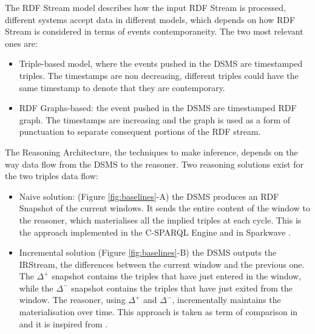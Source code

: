The RDF Stream model describes how the input RDF Stream is processed, different systems accept data in different models, which depends on how RDF Stream is considered in terms of events contemporaneity. The two most relevant ones are:

\begin{itemize}	
\item Triple-based model, where the events pushed in the DSMS are timestamped triples. The timestamps are non decreasing, different triples could have the same timestamp to denote that they are contemporary.
\item RDF Graphs-based: the event pushed in the DSMS are timestamped RDF graph. The timestamps are increasing and the graph is used as a form of punctuation \cite{Tatbul2003b} to separate consequent portions of the RDF stream.
\end{itemize}

The Reasoning Architecture, the techniques to make inference, depends on the way data flow from the DSMS to the reasoner. Two reasoning solutions exist for the two triples data flow:

\begin{itemize}
\item Naive solution: (Figure \ref{fig:baselines}-A) the DSMS produces an RDF Snapshot of the current windows. It sends the entire content of the window to the reasoner, which materialises all the implied triples at each cycle. This is the approach implemented in the C-SPARQL Engine \cite{DBLP:journals/sigmod/BarbieriBCVG10} and in Sparkwave \cite{DBLP:conf/debs/KomazecCF12}.
\item Incremental solution (Figure \ref{fig:baselines}-B) the DSMS outputs the IRStream, the differences between the current window and the previous one. The $\Delta^{+}$ snapshot contains the triples that have just entered in the window, while the $\Delta^{-}$ snapshot contains the triples that have just exited from the window. The reasoner, using $\Delta^{+}$ and $\Delta^{-}$, incrementally maintains the materialisation over time. This approach is taken as term of comparison in \cite{DellAglio2014} and it is inspired from \cite{DBLP:conf/cikm/RenP11}.
\end{itemize}

